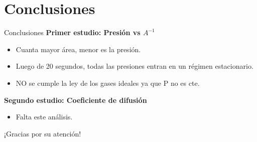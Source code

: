 \documentclass{beamer}
\begin{document}
\section{Conclusiones}
\begin{frame}{Conclusiones}
  \textbf{Primer estudio: Presión vs $A^{-1}$}
  \begin{itemize}
    \item Cuanta mayor área, menor es la presión.
    \item Luego de 20 segundos, todas las presiones entran en un régimen estacionario.
    \item NO se cumple la ley de los gases ideales ya que P no es cte.
  \end{itemize}
  \textbf{Segundo estudio: Coeficiente de difusión}
  \begin{itemize}
    \item Falta este análisis.
  \end{itemize}
\end{frame}

\begin{frame}{}
  \centering
  \Huge ¡Gracias por su atención!
\end{frame}
\end{document}
